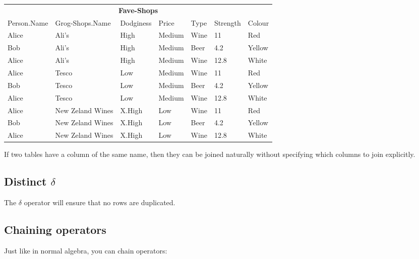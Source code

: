 \begin{center}
  \begin{tabular}{lllllll}
    \multicolumn{7}{c}{\textbf{Fave-Shops}}\\
    {Person.Name} & {Grog-Shops.Name}& {Dodginess} & {Price} & {Type} & {Strength} & {Colour}\\ \hline
    Alice         &  Ali's            & High        & Medium  & Wine          & 11                & Red\\
    Bob           &  Ali's            & High        & Medium  & Beer          & 4.2               & Yellow\\
    Alice         &  Ali's            & High        & Medium  & Wine          & 12.8              & White\\
    Alice         &  Tesco            & Low         & Medium  & Wine          & 11                & Red\\
    Bob           &  Tesco            & Low         & Medium  & Beer          & 4.2               & Yellow\\
    Alice         &  Tesco            & Low         & Medium  & Wine          & 12.8              & White\\
    Alice         &  New Zeland Wines & X.High      & Low     & Wine          & 11                & Red\\
    Bob           &  New Zeland Wines & X.High      & Low     & Beer          & 4.2               & Yellow\\
    Alice         &  New Zeland Wines & X.High      & Low     & Wine          & 12.8              & White\\
  \end{tabular}
\end{center}

If two tables have a column of the same name, then they can be joined naturally
without specifying which columns to join explicitly.

\subsection{Distinct $\delta$}

The $\delta$ operator will ensure that no rows are duplicated.

\subsection{Chaining operators}

Just like in normal algebra, you can chain operators:

